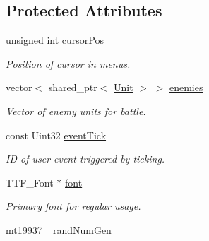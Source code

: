 \subsection*{Protected Attributes}
\begin{DoxyCompactItemize}
\item 
unsigned int \hyperlink{class_game_state_a31555272335ffcfb24af67bc826e1521}{cursor\+Pos}\hypertarget{class_game_state_a31555272335ffcfb24af67bc826e1521}{}\label{class_game_state_a31555272335ffcfb24af67bc826e1521}

\begin{DoxyCompactList}\small\item\em Position of cursor in menus. \end{DoxyCompactList}\item 
vector$<$ shared\+\_\+ptr$<$ \hyperlink{class_unit}{Unit} $>$ $>$ \hyperlink{class_game_state_a5a075a4ab1460fb1035c6b87c56e6c05}{enemies}\hypertarget{class_game_state_a5a075a4ab1460fb1035c6b87c56e6c05}{}\label{class_game_state_a5a075a4ab1460fb1035c6b87c56e6c05}

\begin{DoxyCompactList}\small\item\em Vector of enemy units for battle. \end{DoxyCompactList}\item 
const Uint32 \hyperlink{class_game_state_a27785a1da6711d7ec2d777bd029830b9}{event\+Tick}\hypertarget{class_game_state_a27785a1da6711d7ec2d777bd029830b9}{}\label{class_game_state_a27785a1da6711d7ec2d777bd029830b9}

\begin{DoxyCompactList}\small\item\em ID of user event triggered by ticking. \end{DoxyCompactList}\item 
T\+T\+F\+\_\+\+Font $\ast$ \hyperlink{class_game_state_a39f32585535aa7a90c2e66f1e6d474e0}{font}\hypertarget{class_game_state_a39f32585535aa7a90c2e66f1e6d474e0}{}\label{class_game_state_a39f32585535aa7a90c2e66f1e6d474e0}

\begin{DoxyCompactList}\small\item\em Primary font for regular usage. \end{DoxyCompactList}\item 
mt19937\+\_ \hyperlink{class_game_state_a64e33a5deae96a673585c1a408abce5a}{rand\+Num\+Gen}\hypertarget{class_game_state_a64e33a5deae96a673585c1a408abce5a}{}\label{class_game_state_a64e33a5deae96a673585c1a408abce5a}


\end{DoxyCompactItemize}
